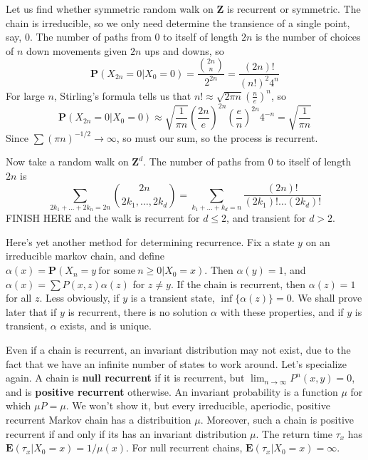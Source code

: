 \begin{example}
    Let us find whether symmetric random walk on $\mathbf{Z}$ is recurrent or symmetric. The chain is irreducible, so we only need determine the transience of a single point, say, 0. The number of paths from 0 to itself of length $2n$ is the number of choices of $n$ down movements given $2n$ ups and downs, so
    \[ \mathbf{P}(X_{2n} = 0 | X_0 = 0) = \frac{\binom{2n}{n}}{2^{2n}} = \frac{(2n)!}{(n!)^2 4^n} \]
    For large $n$, Stirling's formula tells us that $n! \approx \sqrt{2 \pi n} \left( \frac{n}{e} \right)^n$, so
    \[ \mathbf{P}(X_{2n} = 0 | X_0 = 0) \approx \sqrt{\frac{1}{\pi n}} \left( \frac{2n}{e} \right)^{2n} \left( \frac{e}{n} \right)^{2n} 4^{-n} = \sqrt{\frac{1}{\pi n}} \]
    Since $\sum (\pi n)^{-1/2} \to \infty$, so must our sum, so the process is recurrent.

    Now take a random walk on $\mathbf{Z}^d$. The number of paths from 0 to itself of length $2n$ is
    \[ \sum_{2k_1 + \dots + 2k_n = 2n} \binom{2n}{2k_1, \dots, 2k_d} = \sum_{k_1 + \dots + k_d = n} \frac{(2n)!}{(2k_1)! \dots (2k_d)!} \]
    FINISH HERE
    and the walk is recurrent for $d \leq 2$, and transient for $d > 2$.
\end{example}

Here's yet another method for determining recurrence. Fix a state $y$ on an irreducible markov chain, and define $\alpha(x) = \mathbf{P}(X_n = y\ \text{for some}\ n \geq 0 | X_0 = x)$. Then $\alpha(y) = 1$, and $\alpha(x) = \sum P(x,z) \alpha(z)$ for $z \neq y$. If the chain is recurrent, then $\alpha(z) = 1$ for all $z$. Less obviously, if $y$ is a transient state, $\inf \{ \alpha(z) \} = 0$. We shall prove later that if $y$ is recurrent, there is no solution $\alpha$ with these properties, and if $y$ is transient, $\alpha$ exists, and is unique.

Even if a chain is recurrent, an invariant distribution may not exist, due to the fact that we have an infinite number of states to work around. Let's specialize again. A chain is {\bf null recurrent} if it is recurrent, but $\lim_{n \to \infty} P^n(x,y) = 0$, and is {\bf positive recurrent} otherwise. An invariant probability is a function $\mu$ for which $\mu P = \mu$. We won't show it, but every irreducible, aperiodic, positive recurrent Markov chain has a distribuition $\mu$. Moreover, such a chain is positive recurrent if and only if its has an invariant distribution $\mu$. The return time $\tau_x$ has $\mathbf{E}(\tau_x | X_0 = x) = 1/\mu(x)$. For null recurrent chains, $\mathbf{E}(\tau_x | X_0 = x) = \infty$.

